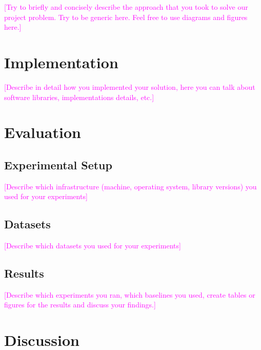 \documentclass[sigconf,10pt]{acmart}
\newcommand{\todo}[1]{\textcolor{magenta}{[#1]}}
\begin{document}
\todo{Try to briefly and concisely describe the approach that you took to solve our project problem. Try to be generic here. Feel free to use diagrams and figures here.}

\blindtext

\blindtext

\blindtext

\section{Implementation}

\todo{Describe in detail how you implemented your solution, here you can talk about software libraries, implementations details, etc.}

\blindtext

\blindtext

\blindtext

\section{Evaluation}

\subsection{Experimental Setup}

\todo{Describe which infrastructure (machine, operating system, library versions) you used for your experiments}

\blindtext

\subsection{Datasets}

\todo{Describe which datasets you used for your experiments}

\blindtext


\subsection{Results}

\todo{Describe which experiments you ran, which baselines you used, create tables or figures for the results and discuss your findings.}

\blindtext

\blindtext

\blindtext


\section{Discussion}
\end{document}
